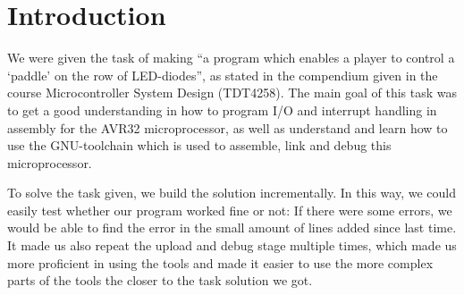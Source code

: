 \section{Introduction}

We were given the task of making ``a program which enables a player to
control a `paddle' on the row of LED-diodes'', as stated in the
compendium given in the course Microcontroller System Design (TDT4258).
The main goal of this task was to get a good understanding in how to
program I/O and interrupt handling in assembly for the AVR32
microprocessor, as well as understand and learn how to use the
GNU-toolchain which is used to assemble, link and debug this
microprocessor.

To solve the task given, we build the solution incrementally. In this
way, we could easily test whether our program worked fine or not: If
there were some errors, we would be able to find the error in the small
amount of lines added since last time. It made us also repeat the upload
and debug stage multiple times, which made us more proficient in using
the tools and made it easier to use the more complex parts of the tools
the closer to the task solution we got. 

\begin{comment}
The reader should know how general processors work, how 
\end{comment}


